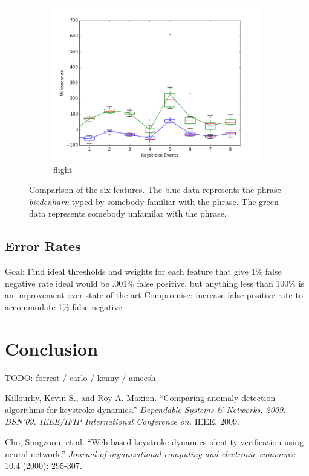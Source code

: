 \documentclass{article}
\begin{document}
\begin{figure}[H]
  \begin{subfigure}[b]{0.3\textwidth}
    \includegraphics[width=\textwidth]{biedenharn_jordan_flight_final.png}
    \caption{flight}
    \label{all_graphs:flight}
  \end{subfigure}
  \caption{Comparison of the six features. The blue data represents the phrase \textit{biedenharn} typed by somebody familiar with the phrase. The green data represents somebody unfamilar with the phrase.}
  \label{all_graphs}
\end{figure}

\subsection{Error Rates}    %

Goal: Find ideal thresholds and weights for each feature that give 1\% false negative rate
ideal would be  .001\% false positive, but anything less than 100\% is an improvement over state of the art
Compromise: increase false positive rate to accommodate 1\% false negative

\section{Conclusion}
TODO: forrest / carlo / kenny / ameesh


\begin{thebibliography}{99}
   Killourhy, Kevin S., and Roy A. Maxion. 
   ``Comparing anomaly-detection algorithms for keystroke dynamics.''
   \textit{Dependable Systems \& Networks, 2009. DSN'09. IEEE/IFIP International Conference on.}
   IEEE, 2009. 
 
   Cho, Sungzoon, et al.
   ``Web-based keystroke dynamics identity verification using neural network.'' 
   \textit{Journal of organizational computing and electronic commerce}
   10.4 (2000): 295-307.
  
\end{thebibliography}
\end{document}
